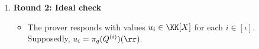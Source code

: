 \begin{construction}
\begin{enumerate}[leftmargin=*]
\begin{itemize}[leftmargin=*]
The claim \eqref{e:iop_ideal_eq} is replaced by
%
\begin{equation}\label{e:projected_Q_claim}
   \pi_q(Q^{(i)}(\zz)) \in (\pi_q(h_i)) \qquad  \text{ for all } \zz\in \bits^{n'}, \ i \in [\iota].
\end{equation}
Recall (cf.\ \cref{d:projections}) that $\pi_q$ is coefficient-wise reduction modulo $q$ when $\ring=\ZZ$, and it is the identity map when $\ring$ is a field $\FF$ of characteristic $q$.
\item The verifier samples and sends a random point $\rr\in \KK^{n'}$.
\end{itemize}
\item \textbf{Round 2: Ideal check}
\begin{itemize}[leftmargin=*]
\item The prover responds with values $u_i\in \KK[X]$ for each $i\in [\iota]$. Supposedly, 
%
$
u_i = \pi_q(Q^{(i)})(\rr).
$


\end{itemize}
\end{enumerate}
\end{construction}
